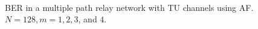 \begin{figure}
{	 \\
}
\caption{BER in a multiple path relay network with TU channels using AF.  $N = 128, m = 1, 2, 3$, and $4$.}
\label{fig:mp_af_ber_plots_TU}
\end{figure}

